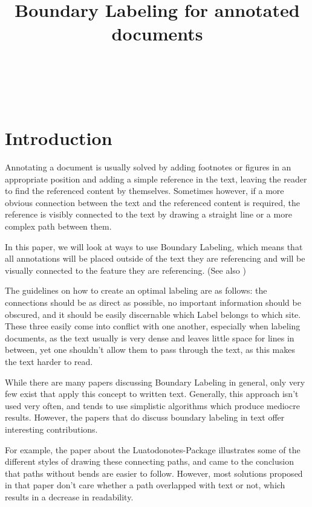 \documentclass[11pt,a4paper]{article}
\title{Boundary Labeling for annotated documents}%
\author{
 \authorname{Jakob Klinger} \\
 \studentnumber{1125755} \\
 \curriculum{033 534} \\
 \email{e1125755@student.tuwien.ac.at}
}
\begin{document}
\maketitle


\section{Introduction}%
Annotating a document is usually solved by adding footnotes or figures in an appropriate position and adding a simple reference in the text, leaving the reader to find the referenced content by themselves. Sometimes however, if a more obvious connection between the text and the referenced content is required, the reference is visibly connected to the text by drawing a straight line or a more complex path between them.

In this paper, we will look at ways to use Boundary Labeling, which means that all annotations will be placed outside of the text they are referencing and will be visually connected to the feature they are referencing. (See also \cite{Bekos2007}) 

The guidelines on how to create an optimal labeling are as follows: the connections should be as direct as possible, no important information should be obscured, and it should be easily discernable which Label belongs to which site. These three easily come into conflict with one another, especially when labeling documents, as the text usually is very dense and leaves little space for lines in between, yet one shouldn't allow them to pass through the text, as this makes the text harder to read. 

While there are many papers discussing Boundary Labeling in general, only very few exist that apply this concept to written text. Generally, this approach isn't used very often, and tends to use simplistic algorithms which produce mediocre results. %
However, the papers that do discuss boundary labeling in text offer interesting contributions.

For example, the paper about the Luatodonotes-Package\cite{Kindermann2014} illustrates some of the different styles of drawing these connecting paths, and came to the conclusion that paths without bends are easier to follow. %
However, most solutions proposed in that paper don't care whether a path overlapped with text or not, which results in a decrease in readability.
\end{document}
